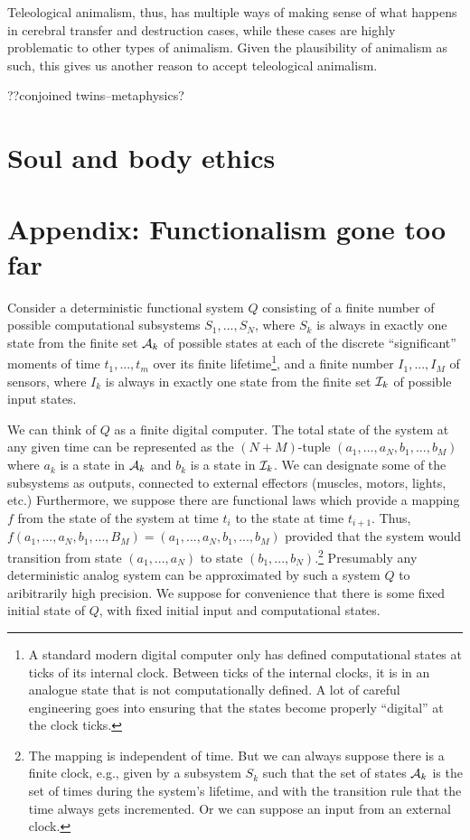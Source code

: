 Teleological animalism, thus, has multiple ways of making sense of what happens in cerebral transfer and destruction cases, while these cases
are highly problematic to other types of animalism. Given the plausibility of animalism as such, this gives us another reason to accept
teleological animalism.


??conjoined twins--metaphysics?


\section{Soul and body ethics}
\section*{Appendix: Functionalism gone too far}
Consider a deterministic functional system $Q$ consisting of a 
finite number of possible computational subsystems $S_1,...,S_N$, where $S_k$ is always in exactly one state from the finite set $\mathcal A_k$
of possible states at each of the discrete ``significant'' moments of time $t_1,...,t_m$ over its finite lifetime\footnote{A standard modern digital computer only has defined 
computational states at ticks of its internal clock. Between ticks of the internal clocks, it is in an analogue state that is not
computationally defined. A lot of careful engineering goes into ensuring that the states become properly ``digital'' at the clock ticks.}, and 
a finite number $I_1,...,I_M$ of sensors, where $I_k$ is always in exactly one state from the finite set $\mathcal I_k$ of possible input
states. 

We can think of $Q$ as a finite digital computer. The total state of the system at any given time can be represented as the
$(N+M)$-tuple $(a_1,...,a_N,b_1,...,b_M)$ where $a_k$ is a state in $\mathcal A_k$ and $b_k$ is a state in $\mathcal I_k$. We can designate some of
the subsystems as outputs, connected to external effectors (muscles, motors, lights, etc.)  Furthermore, we suppose there are functional laws which provide a 
mapping $f$ from the state of the system at time $t_i$ to the state at time $t_{i+1}$. Thus, $f(a_1,...,a_N,b_1,...,B_M)= (a_1,...,a_N,b_1,...,b_M)$ 
provided that the system would transition from state $(a_1,...,a_N)$ to state $(b_1,...,b_N)$.\footnote{The mapping is independent of time. But we 
can always suppose there is a finite clock, e.g., given by a subsystem $S_k$ such that the set of states $\mathcal A_k$ is
the set of times during the system's lifetime, and with the transition rule that the time always gets incremented. Or we can suppose an input
from an external clock.} Presumably any deterministic analog system can be approximated by such a system $Q$ to aribitrarily high precision.
We suppose for convenience that there is some fixed initial state of $Q$, with fixed initial input and computational states.

